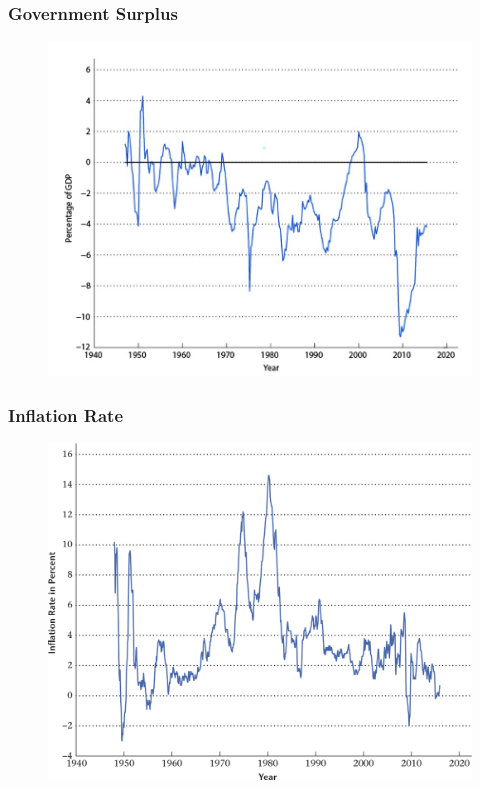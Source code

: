 \documentclass{beamer}
\begin{document}
\begin{frame}
\frametitle[alignment=center]{Government Surplus}
\begin{figure}
\includegraphics[scale=0.6]{Figures/W_Fig_1pt9.png}
\end{figure}
\end{frame}

\begin{frame}
\frametitle[alignment=center]{Inflation Rate}
\begin{figure}
\includegraphics[scale=0.6]{Figures/W_Fig_1pt10.png}
\end{figure}
\end{frame}
\end{document}
